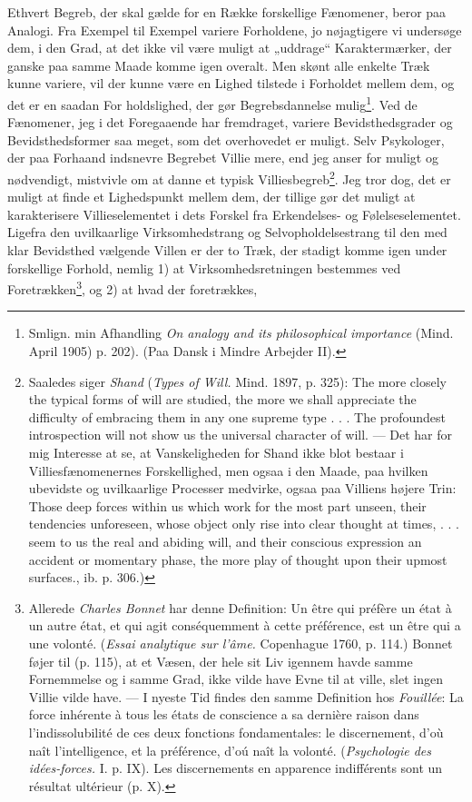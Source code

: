 \documentclass[12pt,a4paper,openany]{book}
\newcommand{\opage}[1]{\marginnote{\footnotesize\textit{[#1]}}}
\begin{document}
Ethvert Begreb, der skal gælde for en Række forskellige
Fænomener, beror paa Analogi. Fra Exempel til Exempel
variere Forholdene, jo nøjagtigere vi undersøge dem, i den
Grad, at det ikke vil være muligt at „uddrage“ Karaktermærker,
der ganske paa samme Maade komme igen overalt. Men skønt
alle enkelte Træk kunne variere, vil der kunne være en Lighed
tilstede i Forholdet mellem dem, og det er en saadan For%
\setcounter{footnote}{0}%
\opage{44}holdslighed, der gør Begrebsdannelse mulig\footnote[1]{Smlign. min Afhandling \textit{On analogy and its philosophical importance} (Mind. April 1905) p. 202). (Paa Dansk i Mindre Arbejder II).}. Ved de Fænomener,
jeg i det Foregaaende har fremdraget, variere Bevidsthedsgrader
og Bevidsthedsformer saa meget, som det overhovedet
er muligt. Selv Psykologer, der paa Forhaand indsnevre
Begrebet Villie mere, end jeg anser for muligt og nødvendigt,
mistvivle om at danne et typisk Villiesbegreb\footnote[2]{Saaledes siger \textit{Shand} (\textit{Types of Will.} Mind. 1897, p. 325): The more closely the typical forms of will are studied, the more we shall appreciate the difficulty of embracing them in any one supreme type . . . The profoundest introspection will not show us the universal character of will. --- Det har for mig Interesse at se, at Vanskeligheden for Shand ikke blot bestaar i Villiesfænomenernes Forskellighed, men ogsaa i den Maade, paa hvilken ubevidste og uvilkaarlige Processer medvirke, ogsaa paa Villiens højere Trin: Those deep forces within us which work for the most part unseen, their tendencies unforeseen, whose object only rise into clear thought at times, . . . seem to us the real and abiding will, and their conscious expression an accident or momentary phase, the more play of thought upon their upmost surfaces., ib. p. 306.)}. Jeg tror dog,
det er muligt at finde et Lighedspunkt mellem dem, der tillige
gør det muligt at karakterisere Villieselementet i dets Forskel
fra Erkendelses- og Følelseselementet. Ligefra den uvilkaarlige
Virksomhedstrang og Selvopholdelsestrang til den med klar
Bevidsthed vælgende Villen er der to Træk, der stadigt komme
igen under forskellige Forhold, nemlig 1) at Virksomhedsretningen
bestemmes ved Foretrækken\footnote[3]{Allerede \textit{Charles Bonnet} har denne Definition: Un être qui préfère un état à un autre état, et qui agit conséquemment à cette préférence, est un être qui a une volonté. (\textit{Essai analytique sur l’âme.} Copenhague 1760, p. 114.) Bonnet føjer til (p. 115), at et Væsen, der hele sit Liv igennem havde samme Fornemmelse og i samme Grad, ikke vilde have Evne til at ville, slet ingen Villie vilde have. --- I nyeste Tid findes den samme Definition hos \textit{Fouillée}: La force inhérente à tous les états de conscience a sa dernière raison dans l’indissolubilité de ces deux fonctions fondamentales: le discernement, d’où naît l’intelligence, et la préférence, d’oú naît la volonté. (\textit{Psychologie des idées-forces.} I. p. IX). Les discernements en apparence indifférents sont un résultat ultérieur (p. X).}, og 2) at hvad der foretrækkes,
\end{document}
